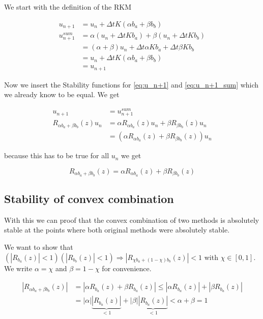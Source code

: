 \documentclass{article}
\begin{document}
We start with the definition of the RKM

\begin{align}
u_{n+1} &= u_n + \Delta t K (\alpha b_a+\beta b_b) \label{eq:u_n+1}  \\
u_{n+1}^{sum} &= \alpha (u_n + \Delta t K b_a) + \beta (u_n + \Delta t K b_b) \label{eq:u_n+1_sum} \\
& = (\alpha + \beta) u_n + \Delta t \alpha K b_a + \Delta t \beta K b_b \\
&= u_n + \Delta t K (\alpha b_a+\beta b_b) \\
&=u_{n+1} 
\end{align}

Now we insert the Stability functions for \ref{eq:u_n+1} and \ref{eq:u_n+1_sum} which we already know to be equal. We get 

\begin{align}
u_{n+1} &= u_{n+1}^{sum} \\
R_{\alpha b_a+\beta b_b}(z) u_n &= \alpha R_{\alpha b_a}(z) u_n + \beta R_{\beta b_b}(z) u_n \\
&= (\alpha R_{\alpha b_a}(z) + \beta R_{\beta b_b}(z)) u_n
\end{align}

because this has to be true for all $u_n$ we get

\begin{equation}
R_{\alpha b_a+\beta b_b}(z) = \alpha R_{\alpha b_a}(z) + \beta R_{\beta b_b}(z) 
\end{equation}

\subsection{Stability of convex combination}\label{proof:convex_comb}

With this we can proof that the convex combination of two methods is absolutely stable at the points where both original methods were absolutely stable.

We want to show that $(|R_{b_a}(z)|  < 1) (|R_{b_b}(z)| < 1) \Rightarrow |R_{\chi b_a +(1- \chi) b_b}(z)| < 1$ with $\chi \in [0,1]$.
We write $\alpha = \chi$ and $\beta = 1-\chi$ for convenience.

\begin{align}
|R_{\alpha b_a +\beta b_b}(z)| &= |\alpha R_{b_a}(z) + \beta R_{b_a}(z)| \leq |\alpha R_{b_a}(z)| + |\beta R_{b_a}(z)|\\
 &=| \alpha| \underbrace{|R_{b_a}(z)|}_{<1} + |\beta| \underbrace{|R_{b_a}(z)|}_{<1} < \alpha + \beta = 1
\end{align}
\end{document}
